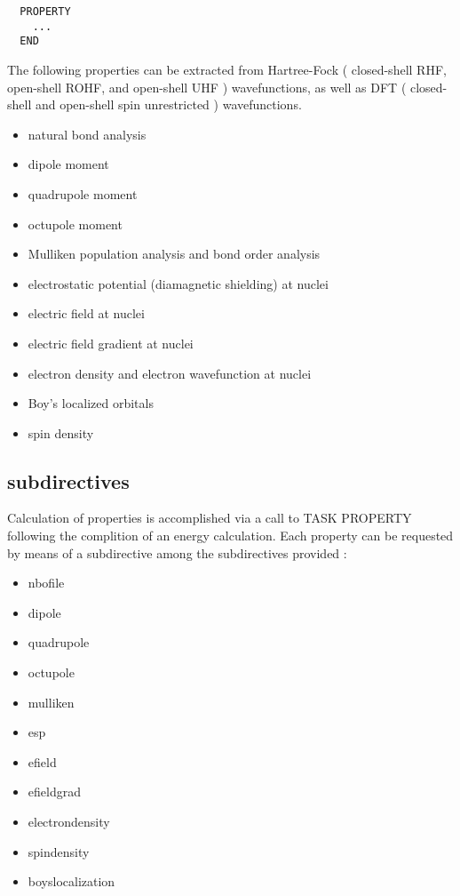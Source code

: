 \label{sec:property}
\begin{verbatim}
  PROPERTY
    ...
  END
\end{verbatim}

The following properties can be extracted from 
Hartree-Fock ( closed-shell RHF, open-shell ROHF,
and open-shell UHF ) wavefunctions, as well as
DFT ( closed-shell and open-shell spin unrestricted )
wavefunctions.

\begin{itemize}
\item natural bond analysis
\item dipole moment
\item quadrupole moment
\item octupole moment
\item Mulliken population analysis and bond order analysis
\item electrostatic potential (diamagnetic shielding) at nuclei 
\item electric field at nuclei 
\item electric field gradient at nuclei 
\item electron density and electron wavefunction at nuclei 
\item Boy's localized orbitals
\item spin density
\end{itemize}

\subsection{subdirectives}

Calculation of properties is accomplished via a call to
TASK PROPERTY following the complition of an energy calculation.
Each property can be requested by means of a subdirective among
the subdirectives provided :

\begin{itemize}
\item nbofile
\item dipole
\item quadrupole
\item octupole
\item mulliken
\item esp
\item efield
\item efieldgrad
\item electrondensity
\item spindensity
\item boyslocalization
\end{itemize}

